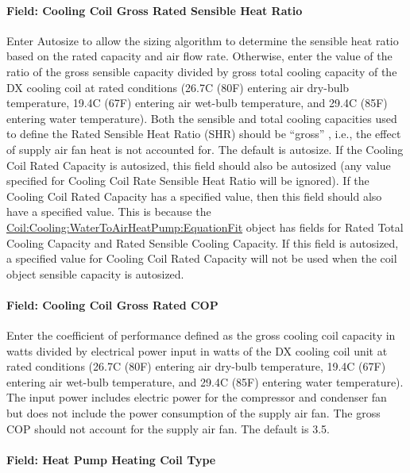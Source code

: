 \paragraph{Field: Cooling Coil Gross Rated Sensible Heat Ratio}\label{field-cooling-coil-gross-rated-sensible-heat-ratio-2}

Enter Autosize to allow the sizing algorithm to determine the sensible heat ratio based on the rated capacity and air flow rate. Otherwise, enter the value of the ratio of the gross sensible capacity divided by gross total cooling capacity of the DX cooling coil at rated conditions (26.7C (80F) entering air dry-bulb temperature, 19.4C (67F) entering air wet-bulb temperature, and 29.4C (85F) entering water temperature). Both the sensible and total cooling capacities used to define the Rated Sensible Heat Ratio (SHR) should be ``gross'' , i.e., the effect of supply air fan heat is not accounted for. The default is autosize. If the Cooling Coil Rated Capacity is autosized, this field should also be autosized (any value specified for Cooling Coil Rate Sensible Heat Ratio will be ignored). If the Cooling Coil Rated Capacity has a specified value, then this field should also have a specified value. This is because the \hyperref[coilcoolingwatertoairheatpumpequationfit]{Coil:Cooling:WaterToAirHeatPump:EquationFit} object has fields for Rated Total Cooling Capacity and Rated Sensible Cooling Capacity. If this field is autosized, a specified value for Cooling Coil Rated Capacity will not be used when the coil object sensible capacity is autosized.

\paragraph{Field: Cooling Coil Gross Rated COP}\label{field-cooling-coil-gross-rated-cop-1}

Enter the coefficient of performance defined as the gross cooling coil capacity in watts divided by electrical power input in watts of the DX cooling coil unit at rated conditions (26.7C (80F) entering air dry-bulb temperature, 19.4C (67F) entering air wet-bulb temperature, and 29.4C (85F) entering water temperature). The input power includes electric power for the compressor and condenser fan but does not include the power consumption of the supply air fan. The gross COP should not account for the supply air fan. The default is 3.5.

\paragraph{Field: Heat Pump Heating Coil Type}\label{field-heat-pump-heating-coil-type-1}

